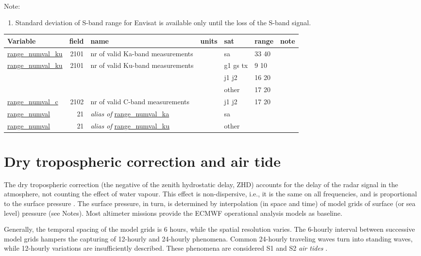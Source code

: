 \documentclass[a4paper,11pt,openany,natbib]{thesis}
\makeatletter
\newcommand\var[1]{\url{#1}\index{variables!#1@\protect\url{#1}}}
\newcommand\alias[1]{\emph{alias of} \var{#1}}
\newenvironment{vartable}{
\begin{table}[ht]
\small
\begin{tabular}{lrllllr}
\hline
Variable & field & name & units & sat & range & note \\
\hline
}{
\hline
\end{tabular}
\end{table}
}
\makeatother
\begin{document}
Note:
\begin{enumerate}
\item Standard deviation of S-band range for Envisat is available only until the loss of the S-band signal.\label{item:range_rms_s}
\end{enumerate}

\begin{vartable}
\var{range_numval_ku} & 2101 & nr of valid Ka-band measurements && sa & 33 40 & \\
\var{range_numval_ku} & 2101 & nr of valid Ku-band measurements && g1 gs tx & 9 10 & \\
                      &      &                                      && j1 j2 & 16 20 & \\
                      &      &                                      && other & 17 20 & \\
\var{range_numval_c} & 2102 & nr of valid C-band measurements && j1 j2 & 17 20 & \\
\hline
\var{range_numval} &   21 & \alias{range_numval_ka} && sa && \\
\var{range_numval} &   21 & \alias{range_numval_ku} && other && \\
\end{vartable}

\section{Dry tropospheric correction and air tide}
\label{var:dry_tropo}
The dry tropospheric correction (the negative of the zenith hydrostatic delay, ZHD) accounts for the delay of the radar signal in the atmosphere, not counting the effect of water vapour. This effect is non-dispersive, i.e., it is the same on all frequencies, and is proportional to the surface pressure \citep{saastamoinen1972}. The surface pressure, in turn, is determined by interpolation (in space and time) of model grids of surface (or sea level) pressure (see Notes). Most altimeter missions provide the ECMWF operational analysis models as baseline.

Generally, the temporal spacing of the model grids is 6 hours, while the spatial resolution varies. The 6-hourly interval between successive model grids hampers the capturing of 12-hourly and 24-hourly phenomena. Common 24-hourly traveling waves turn into standing waves, while 12-hourly variations are insufficiently described. These phenomena are considered S1 and S2 \emph{air tides} \citep{ponte2002}.
\end{document}
